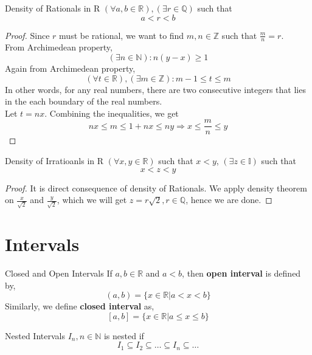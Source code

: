 \begin{theo}{Density of Rationals in R}{}
    $(\forall a,b \in \mathbb{R}), (\exists r \in \mathbb{Q})$ such that
    \[ a < r < b\]
    \tcblower
    \begin{proof} Since $r$ must be rational, we want to find $ m,n \in
        \mathbb{Z}$ such that $\frac{m}{n} = r$.\\
        From Archimedean property,
        \[(\exists n \in \mathbb{N}): n(y-x) \ge 1\]
        Again from Archimedean property,
        \[(\forall t \in \mathbb{R}), (\exists m \in \mathbb{Z}): m-1 \le t \le m\]
        In other words, for any real numbers, there are two consecutive
        integers that lies in the each boundary of the real numbers.\\
        Let $t= nx$. Combining the inequalities, we get
        \[nx \le m \le 1+ nx \le ny \Rightarrow x \le \frac{m}{n} \le y \]
    \end{proof}
\end{theo}

\begin{theo}{Density of Irratioanls in R}{}
    $(\forall x,y \in \mathbb{R})$ such that $x < y$, $(\exists z \in \mathbb{I})$ such that
    \[ x < z <y\]
    \tcblower
    \begin{proof} It is direct consequence of density of Rationals. We
        apply density theorem on $\frac{x}{\sqrt{2}}$ and
        $\frac{y}{\sqrt{2}}$, which we will get $z = r\sqrt{2}, r \in
        \mathbb{Q}$, hence we are done.
    \end{proof}
\end{theo}

\section{Intervals}

\begin{theo}{Closed and Open Intervals}{}
    If $a,b \in \mathbb{R}$ and $a<b$, then \textbf{open interval} is
    defined by,
    \[ (a,b) = \{ x \in \mathbb{R}| a < x < b\}\]
    Similarly, we define \textbf{closed interval} as,
    \[ [a,b] = \{ x \in \mathbb{R}| a \le x \le b\} \]
\end{theo}

\begin{defi}{Nested Intervals}{}
    $I_n, n \in \mathbb{N}$ is nested if
    \[ I_1 \subseteq I_2 \subseteq \ldots \subseteq I_n \subseteq \ldots \]
\end{defi}

